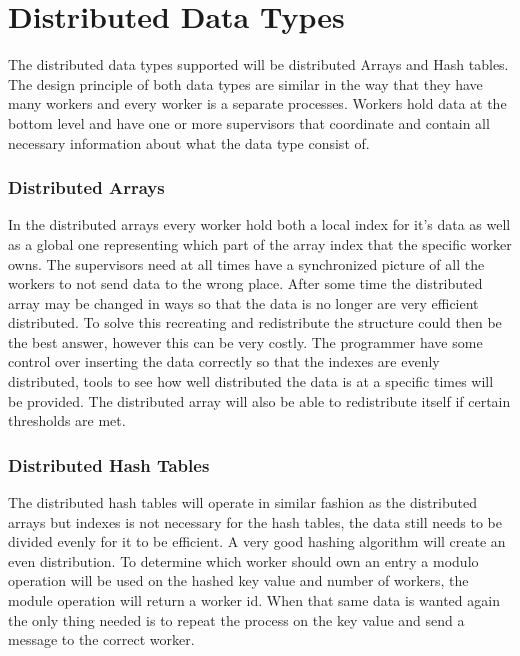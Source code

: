 \section{Distributed Data Types}
The distributed data types supported will be distributed Arrays and Hash tables. The design principle of both data types are similar in the way that they have many workers and every worker is a separate processes. Workers hold data at the bottom level and have one or more supervisors that coordinate and contain all necessary information about what the data type consist of. 

\subsubsection{Distributed Arrays}
In the distributed arrays every worker hold both a local index for it’s data as well as a global one representing which part of the array index that the specific worker owns. The supervisors need at all times have a synchronized picture of all the workers to not send data to the wrong place. After some time the distributed array may be changed in ways so that the data is no longer are very efficient distributed. To solve this recreating and redistribute the structure could then be the best answer, however this can be very costly. The programmer have some control over inserting the data correctly so that the indexes are evenly distributed, tools to see how well distributed the data is at a specific times will be provided. The distributed array will also be able to redistribute itself if certain thresholds are met.

\subsubsection{Distributed Hash Tables}
The distributed hash tables will operate in similar fashion as the distributed arrays but indexes is not necessary for the hash tables, the data still needs to be divided evenly for it to be efficient. A very good hashing algorithm will create an even distribution. To determine which worker should own an entry a modulo operation will be used on the hashed key value and number of workers, the module operation will return a worker id. When that same data is wanted again the only thing needed is to repeat the process on the key value and send a message to the correct worker. \\

